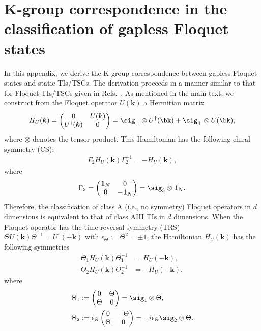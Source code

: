\documentclass[
floatfix,
pra,
twocolumn,
reprint,
amsmath,amssymb,
aps,
footnote,
]{revtex4}
\begin{document}
\section{\label{sec: classification}K-group correspondence in the classification of gapless Floquet states}
In this appendix, we derive the K-group correspondence between gapless Floquet states and static TIs/TSCs. The derivation proceeds in a manner similar to that for Floquet TIs/TSCs given in Refs.~\cite{RoyHarper17, MorimotoPoVishwanath17}.
As mentioned in the main text, we construct from the Floquet operator $U(\bm{k})$ a Hermitian matrix
\begin{align}
	H_U(\bm{k})=
\begin{pmatrix}
0 & U(\bm{k})\\
U^\dag(\bm{k}) & 0
\end{pmatrix}
 = \sig_- \otimes U^\dag(\bk) + \sig_+ \otimes U(\bk)
, \label{eq_HU2}
\end{align}
where $\otimes$ denotes the tensor product.
This Hamiltonian has the following chiral symmetry (CS):
\begin{align}
\Gamma_2 H_U(\bm{k})\Gamma_2^{-1}=-H_U(\bm{k})
,
\label{HU2_chiral2}
\end{align}
where
\begin{align}
	\Gamma_2=
\begin{pmatrix}
\bm{1}_N & 0\\
0 & -\bm{1}_N
\end{pmatrix}
 = \sig_3 \otimes \bm{1}_N
.
\end{align}
Therefore, the classification of class A (i.e., no symmetry) Floquet operators in $d$ dimensions is equivalent to that of class AIII TIs in $d$ dimensions. When the Floquet operator has the time-reversal symmetry (TRS) $\Theta U(\bm{k})\Theta^{-1}=U^\dag(-\bm{k})$ with $\epsilon_\Theta:=\Theta^2=\pm 1$, the Hamiltonian $H_U(\bm{k})$ has the following symmetries
\begin{align}
\Theta_1H_U(\bm{k})\Theta_1^{-1}&=H_U(-\bm{k})
,\label{HU2_T1} \\
\Theta_2H_U(\bm{k})\Theta_2^{-1}&=-H_U(-\bm{k})
, \label{HU2_T2}
\end{align}
where
\begin{align}
\Theta_1 &:=
\begin{pmatrix}
0 & \Theta\\
\Theta & 0
\end{pmatrix}
 = \sig_1 \otimes \Theta
 , \\
\Theta_2 &:= \epsilon_\Theta
\begin{pmatrix}
0 & -\Theta\\
\Theta & 0
\end{pmatrix}
 = -i \epsilon_\Theta \sig_2 \otimes \Theta
.
\end{align}
\end{document}
